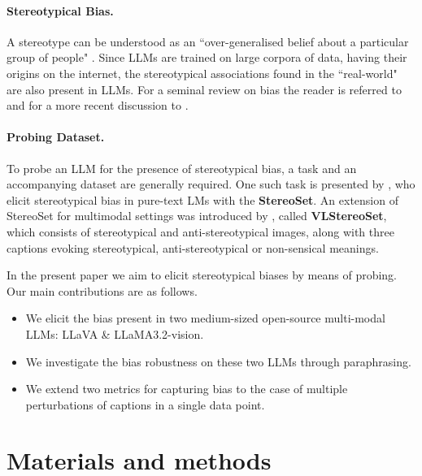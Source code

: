 \documentclass[11pt]{article}
\begin{document}
\paragraph{Stereotypical Bias.} A stereotype can be understood as an ``over-generalised belief about a particular group of people" \citep[1]{nadeem_stereoset_2021}. Since LLMs are trained on large corpora of data, having their origins on the internet, the stereotypical associations found in the ``real-world" are also present in LLMs. For a seminal review on bias the reader is referred to \citet{blodgett_language_2020} and for a more recent discussion to \citet{navigli_biases_2023}.

\paragraph{Probing Dataset.} To probe an LLM for the presence of stereotypical bias, a task and an accompanying dataset are generally required. One such task is presented by \citet{nadeem_stereoset_2021}, who elicit stereotypical bias in pure-text LMs with the \textbf{StereoSet}. An extension of StereoSet for multimodal settings was introduced by \citet{zhou_vlstereoset_2022}, called \textbf{VLStereoSet}, which consists of stereotypical and anti-stereotypical images, along with three captions evoking stereotypical, anti-stereotypical or non-sensical meanings.

In the present paper we aim to elicit stereotypical biases by means of probing. Our main contributions are as follows.
\begin{itemize}
    \item We elicit the bias present in two medium-sized open-source multi-modal LLMs: LLaVA \& LLaMA3.2-vision.
    \item We investigate the bias robustness on these two LLMs through paraphrasing.
    \item We extend two metrics for capturing bias to the case of multiple perturbations of captions in a single data point.
\end{itemize}

\section{Materials and methods}

\end{document}

